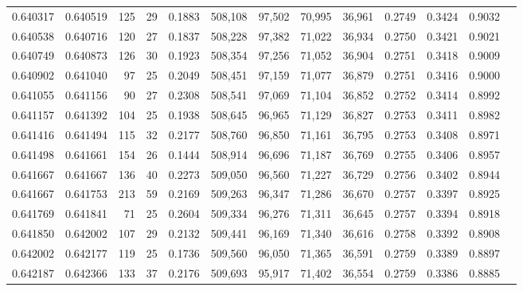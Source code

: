 \begin{tabular}{rrrrrrrrrrrrr}
0.640317 & 0.640519 &    125 &    29 &                                     0.1883 & 508,108 &  97,502 &  70,995 &  36,961 & 0.2749 & 0.3424 & 0.9032 \\
0.640538 & 0.640716 &    120 &    27 &                                     0.1837 & 508,228 &  97,382 &  71,022 &  36,934 & 0.2750 & 0.3421 & 0.9021 \\
0.640749 & 0.640873 &    126 &    30 &                                     0.1923 & 508,354 &  97,256 &  71,052 &  36,904 & 0.2751 & 0.3418 & 0.9009 \\
0.640902 & 0.641040 &     97 &    25 &                                     0.2049 & 508,451 &  97,159 &  71,077 &  36,879 & 0.2751 & 0.3416 & 0.9000 \\
0.641055 & 0.641156 &     90 &    27 &                                     0.2308 & 508,541 &  97,069 &  71,104 &  36,852 & 0.2752 & 0.3414 & 0.8992 \\
0.641157 & 0.641392 &    104 &    25 &                                     0.1938 & 508,645 &  96,965 &  71,129 &  36,827 & 0.2753 & 0.3411 & 0.8982 \\
0.641416 & 0.641494 &    115 &    32 &                                     0.2177 & 508,760 &  96,850 &  71,161 &  36,795 & 0.2753 & 0.3408 & 0.8971 \\
0.641498 & 0.641661 &    154 &    26 &                                     0.1444 & 508,914 &  96,696 &  71,187 &  36,769 & 0.2755 & 0.3406 & 0.8957 \\
0.641667 & 0.641667 &    136 &    40 &                                     0.2273 & 509,050 &  96,560 &  71,227 &  36,729 & 0.2756 & 0.3402 & 0.8944 \\
0.641667 & 0.641753 &    213 &    59 &                                     0.2169 & 509,263 &  96,347 &  71,286 &  36,670 & 0.2757 & 0.3397 & 0.8925 \\
0.641769 & 0.641841 &     71 &    25 &                                     0.2604 & 509,334 &  96,276 &  71,311 &  36,645 & 0.2757 & 0.3394 & 0.8918 \\
0.641850 & 0.642002 &    107 &    29 &                                     0.2132 & 509,441 &  96,169 &  71,340 &  36,616 & 0.2758 & 0.3392 & 0.8908 \\
0.642002 & 0.642177 &    119 &    25 &                                     0.1736 & 509,560 &  96,050 &  71,365 &  36,591 & 0.2759 & 0.3389 & 0.8897 \\
0.642187 & 0.642366 &    133 &    37 &                                     0.2176 & 509,693 &  95,917 &  71,402 &  36,554 & 0.2759 & 0.3386 & 0.8885 \\

\end{tabular}
